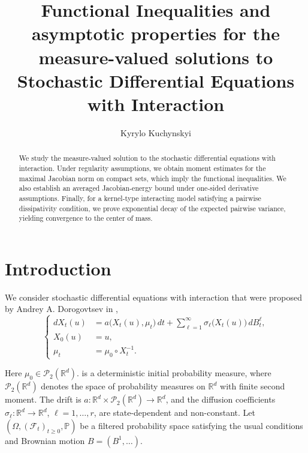 \documentclass{tsp-short}
\title[Interacting SDEs]{Functional Inequalities and asymptotic properties for the measure-valued solutions to Stochastic Differential Equations
with Interaction}
\author{Kyrylo Kuchynskyi}
\theoremstyle{remark}
\theoremstyle{definition}
\newcommand{\R}{\mathbb{R}} %
\newcommand{\cP}{\mathcal{P}} %
\begin{document}
\begin{abstract}
	We study the measure-valued solution to the stochastic differential equations with interaction.
	Under regularity assumptions,  we obtain moment estimates for
	the maximal Jacobian norm on compact sets, which imply the functional inequalities.
	We also establish an averaged Jacobian-energy bound under one-sided derivative assumptions.
	Finally, for a kernel-type interacting model satisfying a pairwise dissipativity condition,
	we prove exponential decay of the expected pairwise variance, yielding convergence to the center of mass.
\end{abstract}

\maketitle

\tableofcontents

\section{Introduction}\label{sec:introduction}

We consider stochastic differential equations with interaction that were proposed by Andrey A. Dorogovtsev in \cite{dorogovtsev2003},
\begin{equation}\label{eq:main-sdewi}
	\begin{cases}
		dX_t(u) & = a\big(X_t(u),\mu_t\big)\,dt + \displaystyle\sum_{\ell=1}^{\infty} \sigma_\ell\bigl(X_t(u))\,dB_t^\ell, \\[1mm]
		X_0(u)  & = u,                                                                                                     \\[1mm]
		\mu_t   & = \mu_0\circ X_t^{-1}.
	\end{cases}
\end{equation}

Here \( \mu_0\in\mathcal P_2(\mathbb R^d).\) is a deterministic initial probability measure, where \(\cP_2(\R^d)\) denotes
the space of probability measures on \(\R^d\) with finite second moment.
The drift is \(a:\R^d\times\cP_2(\R^d)\to\R^d\), and the diffusion
coefficients \(\sigma_\ell:\R^d\to\R^d\), \(\ell=1,\ldots,r\), are state-dependent and non-constant.
Let\( (\Omega,(\mathcal F_t)_{t\ge0},\mathbb P) \) be a filtered probability space satisfying the usual
conditions and  Brownian motion \(B=(B^1, \dots) \).
\end{document}
